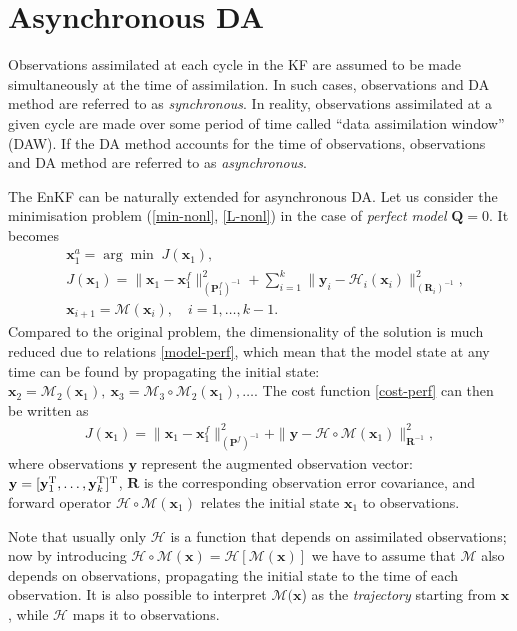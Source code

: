 \documentclass[11pt]{report}
\newcommand{\mb} {\mathbf}
\newcommand{\T}{^{\tiny \mathrm T}}
\begin{document}
\section{Asynchronous DA}

Observations assimilated at each cycle in the KF are assumed to be made simultaneously at the time of assimilation.
In such cases, observations and DA method are referred to as \emph{synchronous}.
In reality, observations assimilated at a given cycle are made over some period of time called ``data assimilation window'' (DAW).
If the DA method accounts for the time of observations, observations and DA method are referred to as \emph{asynchronous}.

The EnKF can be naturally extended for asynchronous DA.
Let us consider the minimisation problem (\ref{min-nonl}, \ref{L-nonl}) in the case of \emph{perfect model} $\mb Q = 0$.
It becomes
\begin{align}
  \label{min-perf}
  &{\mb x_1^a} = \arg \min \; J(\mb x_1),\\
  \label{cost-perf}
  &J(\mb x_1)  = \|\mb x_1 - \mb x_1^f\|^2_{(\mb P_1^f)^{-1}} + \sum_{i = 1}^k \|\mb y_i - \mathcal H_i(\mb x_i)\|^2_{(\mb R_i)^{-1}},\\
  \label{model-perf}
  &\mb x_{i+1} = \mathcal M(\mb x_i),\quad i = 1,\dots,k-1.
\end{align}
Compared to the original problem, the dimensionality of the solution is much reduced due to relations \eqref{model-perf}, which mean that the model state at any time can be found by propagating the initial state: $\mb x_2 = \mathcal M_2(\mb x_1),\ \mb x_3 = \mathcal M_3 \circ \mathcal M_2(\mb x_1), \dots$.
The cost function \eqref{cost-perf} can then be written as
\begin{align}
  \label{cost-async}
  J(\mb x_1)  = \|\mb x_1 - \mb x_1^f\|^2_{(\mb P^f)^{-1}} + \|\mb y - \mathcal H \circ \mathcal M(\mb x_1)\|^2_{\mb R^{-1}},
\end{align}
where observations $\mb y$ represent the augmented observation vector: $\mb y = [\mb y_1\T,\dots,\mb y_k\T]\T$, $\mb R$ is the corresponding observation error covariance, and forward operator $\mathcal H \circ \mathcal M (\mb x_1)$ relates the initial state $\mb x_1$ to observations.

Note that usually only $\mathcal H$ is a function that depends on assimilated observations; now by introducing $\mathcal H \circ \mathcal M (\mb x) = \mathcal H[\mathcal M(\mb x)]$ we have to assume that $\mathcal M$ also depends on observations, propagating the initial state to the time of each observation.
It is also possible to interpret $\mathcal M(\mb x$) as the \emph{trajectory} starting from $\mb x$, while $\mathcal H$ maps it to observations.
\end{document}
